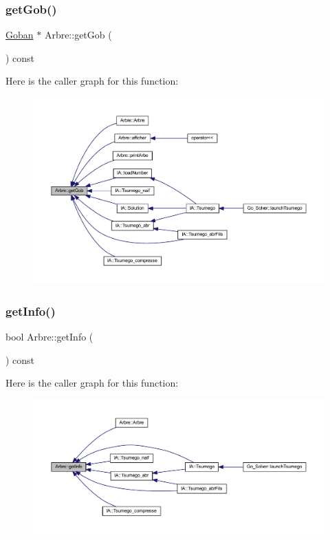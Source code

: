 \subsubsection{\texorpdfstring{get\+Gob()}{getGob()}}
{\footnotesize\ttfamily \hyperlink{class_goban}{Goban} $\ast$ Arbre\+::get\+Gob (\begin{DoxyParamCaption}{ }\end{DoxyParamCaption}) const}

Here is the caller graph for this function\+:
\nopagebreak
\begin{figure}[H]
\begin{center}
\leavevmode
\includegraphics[width=350pt]{class_arbre_ae9d294f541cec5e5fac9ccd8fe8496ee_icgraph}
\end{center}
\end{figure}
\mbox{\label{class_arbre_afc71a182e86352b06193c2dc746fab79}} 
\subsubsection{\texorpdfstring{get\+Info()}{getInfo()}}
{\footnotesize\ttfamily bool Arbre\+::get\+Info (\begin{DoxyParamCaption}{ }\end{DoxyParamCaption}) const}

Here is the caller graph for this function\+:
\nopagebreak
\begin{figure}[H]
\begin{center}
\leavevmode
\includegraphics[width=350pt]{class_arbre_afc71a182e86352b06193c2dc746fab79_icgraph}
\end{center}
\end{figure}
\mbox{\label{class_arbre_a0aef1f091d76bca13229a21fcd45a076}} 
